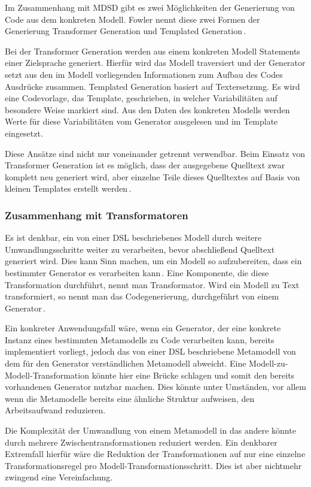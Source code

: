 \documentclass[12pt,oneside,a4paper,parskip]{scrbook}
\begin{document}
Im Zusammenhang mit MDSD gibt es zwei Möglichkeiten der Generierung von Code aus dem konkreten Modell. Fowler nennt diese zwei Formen der Generierung Transformer Generation und Templated Generation\,\cite[S.\,124f.]{fowler2010}.

Bei der Transformer Generation werden aus einem konkreten Modell Statements einer Zielsprache generiert. Hierfür wird das Modell traversiert und der Generator setzt aus den im Modell vorliegenden Informationen zum Aufbau des Codes Ausdrücke zusammen. Templated Generation basiert auf Textersetzung. Es wird eine Codevorlage, das Template, geschrieben, in welcher Variabilitäten auf besondere Weise markiert sind. Aus den Daten des konkreten Modells werden Werte für diese Variabilitäten vom Generator ausgelesen und im Template eingesetzt.

Diese Ansätze sind nicht nur voneinander getrennt verwendbar. Beim Einsatz von Transformer Generation ist es möglich, dass der ausgegebene Quelltext zwar komplett neu generiert wird, aber einzelne Teile dieses Quelltextes auf Basis von kleinen Templates erstellt werden\,\cite[S.\,125]{fowler2010}.

\subsubsection{Zusammenhang mit Transformatoren}

Es ist denkbar, ein von einer DSL beschriebenes Modell durch weitere Umwandlungsschritte weiter zu verarbeiten, bevor abschließend Quelltext generiert wird. Dies kann Sinn machen, um ein Modell so aufzubereiten, dass ein bestimmter Generator es verarbeiten kann\,\cite[S.\,195]{stahl2007}. Eine Komponente, die diese Transformation durchführt, nennt man Transformator. Wird ein Modell zu Text transformiert, so nennt man das Codegenerierung, durchgeführt von einem Generator\,\cite[S.\,271]{voelter2013}.

Ein konkreter Anwendungsfall wäre, wenn ein Generator, der eine konkrete Instanz eines bestimmten Metamodells zu Code verarbeiten kann, bereits implementiert vorliegt, jedoch das von einer DSL beschriebene Metamodell von dem für den Generator verständlichen Metamodell abweicht. Eine Modell-zu-Modell-Transformation könnte hier eine Brücke schlagen und somit den bereits vorhandenen Generator nutzbar machen. Dies könnte unter Umständen, vor allem wenn die Metamodelle bereits eine ähnliche Struktur aufweisen, den Arbeitsaufwand reduzieren.

Die Komplexität der Umwandlung von einem Metamodell in das andere könnte durch mehrere Zwischentransformationen reduziert werden. Ein denkbarer Extremfall hierfür wäre die Reduktion der Transformationen auf nur eine einzelne Transformationsregel pro Modell-Transformationsschritt. Dies ist aber nichtmehr zwingend eine Vereinfachung.
\end{document}
